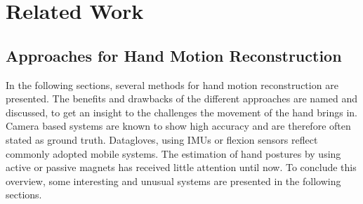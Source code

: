 
\lhead[\chaptername~\thechapter]{\rightmark}

\rhead[\leftmark]{}

\lfoot[\thepage]{}

\cfoot{}

\rfoot[]{\thepage}


\chapter{Related Work}
\label{cha:relatedWork}


\section{Approaches for Hand Motion Reconstruction} \label{sec:approaches}

In the following sections, several methods for hand motion reconstruction are presented. The benefits and drawbacks of the different approaches are named and discussed, to get an insight to the challenges the movement of the hand brings in. Camera based systems are known to show high accuracy and are therefore often stated as ground truth. Datagloves, using \acp{IMU} or flexion sensors reflect commonly adopted mobile systems. The estimation of hand postures by using active or passive magnets has received little attention until now. To conclude this overview, some interesting and unusual systems are presented in the following sections.

